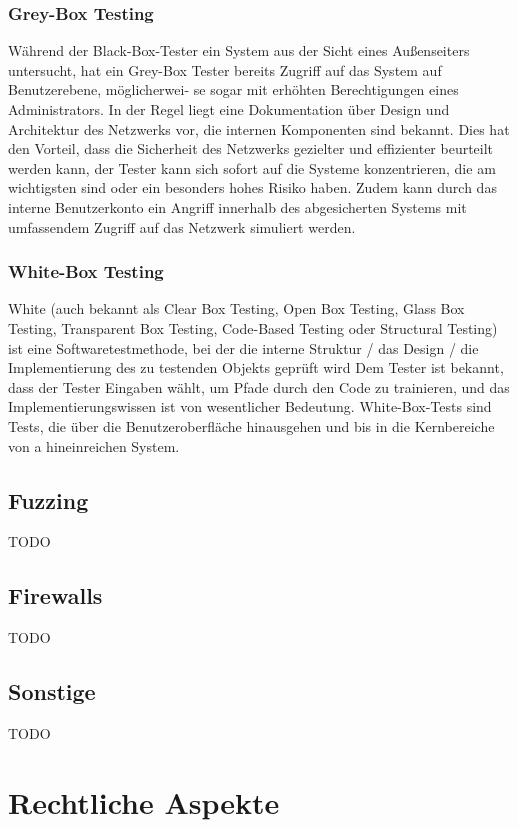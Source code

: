 \documentclass[12pt,oneside,a4paper,parskip]{scrbook}
\begin{document}
    \subsubsection{Grey-Box Testing}
    Während der Black-Box-Tester ein System aus der Sicht eines Außenseiters untersucht, hat ein    Grey-Box Tester bereits Zugriff auf das System auf Benutzerebene, möglicherwei- se sogar mit    erhöhten Berechtigungen eines Administrators. In der Regel liegt eine Dokumentation über Design und Architektur des Netzwerks vor, die internen Komponenten sind bekannt. Dies hat den Vorteil, dass die Sicherheit des Netzwerks gezielter und effizienter beurteilt werden kann, der Tester kann sich sofort auf die Systeme konzentrieren, die am wichtigsten sind oder ein besonders hohes Risiko haben. Zudem kann durch das interne Benutzerkonto ein Angriff innerhalb des abgesicherten Systems mit umfassendem Zugriff auf das Netzwerk simuliert werden.

    \subsubsection{White-Box Testing}
    White (auch bekannt als Clear Box Testing, Open Box Testing, Glass Box Testing, Transparent Box Testing, Code-Based Testing oder Structural Testing) ist eine Softwaretestmethode, bei der die interne Struktur / das Design / die Implementierung des zu testenden Objekts geprüft wird Dem Tester ist bekannt, dass der Tester Eingaben wählt, um Pfade durch den Code zu trainieren, und das Implementierungswissen ist von wesentlicher Bedeutung. White-Box-Tests sind Tests, die über die Benutzeroberfläche hinausgehen und bis in die Kernbereiche von a hineinreichen System.



    \subsection{Fuzzing}
    TODO

    \subsection{Firewalls}
    TODO

    \subsection{Sonstige}
    TODO

  \section{Rechtliche Aspekte}
\end{document}
